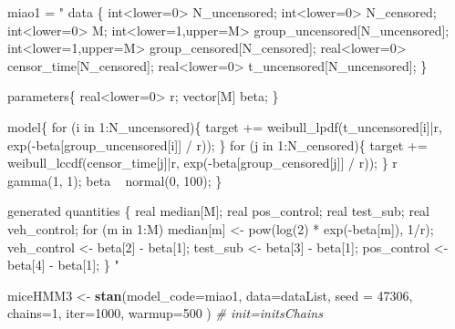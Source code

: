 \documentclass[]{article}
\newenvironment{Shaded}{\begin{snugshade}}{\end{snugshade}}
\newcommand{\KeywordTok}[1]{\textcolor[rgb]{0.13,0.29,0.53}{\textbf{#1}}}
\newcommand{\DataTypeTok}[1]{\textcolor[rgb]{0.13,0.29,0.53}{#1}}
\newcommand{\DecValTok}[1]{\textcolor[rgb]{0.00,0.00,0.81}{#1}}
\newcommand{\StringTok}[1]{\textcolor[rgb]{0.31,0.60,0.02}{#1}}
\newcommand{\CommentTok}[1]{\textcolor[rgb]{0.56,0.35,0.01}{\textit{#1}}}
\newcommand{\NormalTok}[1]{#1}
\begin{document}
\begin{Shaded}
\begin{Highlighting}[]
\NormalTok{miao1 =}\StringTok{ "}
\StringTok{data \{}
\StringTok{  int<lower=0> N_uncensored;}
\StringTok{  int<lower=0> N_censored;}
\StringTok{  int<lower=0> M;}
\StringTok{  int<lower=1,upper=M> group_uncensored[N_uncensored];}
\StringTok{  int<lower=1,upper=M> group_censored[N_censored];}
\StringTok{  real<lower=0> censor_time[N_censored];}
\StringTok{  real<lower=0> t_uncensored[N_uncensored];}
\StringTok{\}}

\StringTok{parameters\{}
\StringTok{  real<lower=0> r;}
\StringTok{  vector[M] beta;}
\StringTok{\}}

\StringTok{model\{}
\StringTok{  for (i in 1:N_uncensored)\{}
\StringTok{    target += weibull_lpdf(t_uncensored[i]|r, exp(-beta[group_uncensored[i]] / r));}
\StringTok{  \}}
\StringTok{  for (j in 1:N_censored)\{}
\StringTok{    target += weibull_lccdf(censor_time[j]|r, exp(-beta[group_censored[j]] / r));}
\StringTok{  \}}
\StringTok{  }
\StringTok{  r ~ gamma(1, 1);}
\StringTok{  beta ~ normal(0, 100);}
\StringTok{  }
\StringTok{\}}

\StringTok{generated quantities \{}
\StringTok{  real median[M];}
\StringTok{  real pos_control;}
\StringTok{  real test_sub;}
\StringTok{  real veh_control;}
\StringTok{  }
\StringTok{  for (m in 1:M)}
\StringTok{    median[m] <- pow(log(2) * exp(-beta[m]), 1/r);}
\StringTok{  }
\StringTok{  veh_control <- beta[2] - beta[1];}
\StringTok{  test_sub    <- beta[3] - beta[1];}
\StringTok{  pos_control <- beta[4] - beta[1];}
\StringTok{\}}
\StringTok{"}


\NormalTok{miceHMM3 <-}\StringTok{ }\KeywordTok{stan}\NormalTok{(}\DataTypeTok{model_code=}\NormalTok{miao1, }\DataTypeTok{data=}\NormalTok{dataList, }\DataTypeTok{seed =} \DecValTok{47306}\NormalTok{, }\DataTypeTok{chains=}\DecValTok{1}\NormalTok{,  }
                    \DataTypeTok{iter=}\DecValTok{1000}\NormalTok{, }
                    \DataTypeTok{warmup=}\DecValTok{500}\NormalTok{ ) }\CommentTok{# init=initsChains}
\end{Highlighting}
\end{Shaded}
\end{document}
